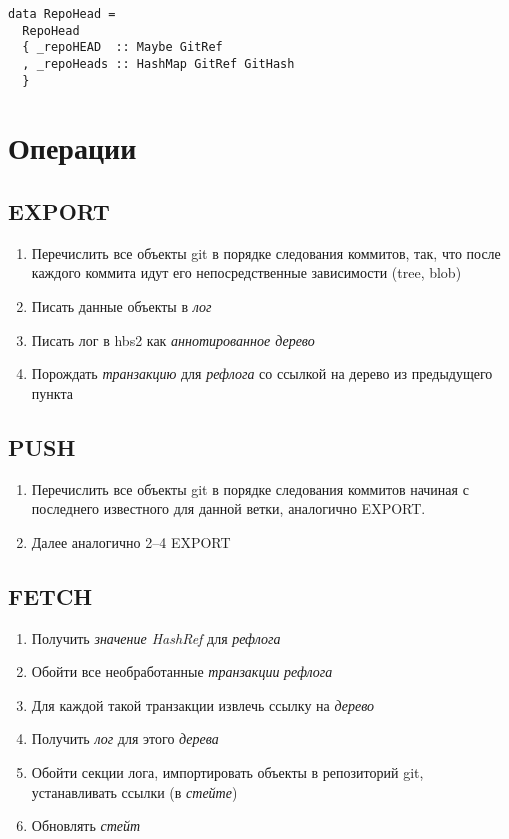 \documentclass[11pt,a4paper]{article}
\newcommand{\term}[2]{\textit{#2}}
\begin{document}
\begin{lstlisting}
data RepoHead =
  RepoHead
  { _repoHEAD  :: Maybe GitRef
  , _repoHeads :: HashMap GitRef GitHash
  }
\end{lstlisting}


\section{Операции}

\subsection{EXPORT}

\begin{enumerate}
  \item Перечислить все объекты git в порядке следования коммитов, так, что после каждого коммита
           идут его непосредственные зависимости (tree, blob)
  \item Писать данные объекты в \term{log}{лог}
  \item Писать лог в hbs2 как \term{ann-merkle-tree}{аннотированное дерево}
  \item Порождать \term{reflog-tran}{транзакцию} для \term{reflog}{рефлога} со ссылкой на дерево из
    предыдущего пункта
\end{enumerate}

\subsection{PUSH}

\begin{enumerate}
  \item Перечислить все объекты git в порядке следования коммитов начиная с последнего известного
    для данной ветки, аналогично EXPORT.
  \item Далее аналогично 2--4 EXPORT
\end{enumerate}

\subsection{FETCH}

\begin{enumerate}
  \item Получить \term{hashref}{значение HashRef} для \term{reflog}{рефлога}
  \item Обойти все необработанные \term{transaction}{транзакции} \term{reflog}{рефлога}
  \item Для каждой такой транзакции извлечь ссылку на \term{merkle-tree}{дерево}
  \item Получить \term{log}{лог} для этого \term{merkle-tree}{дерева}
  \item Обойти секции лога, импортировать объекты в репозиторий git, устанавливать
        ссылки (в \term{state}{стейте})
  \item Обновлять \term{state}{стейт}
\end{enumerate}
\end{document}
